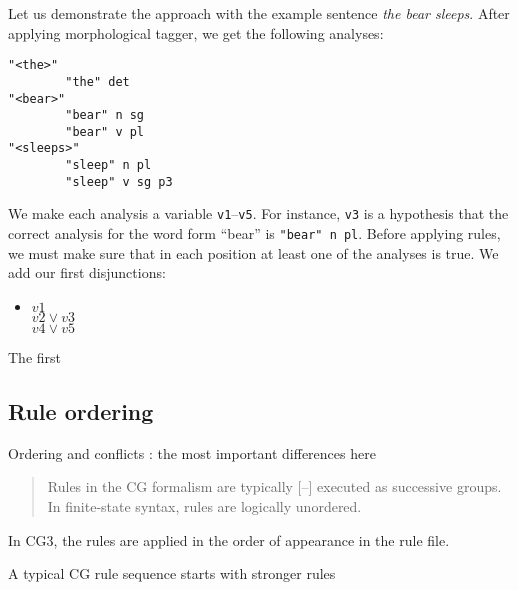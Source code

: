 \documentclass[11pt]{article}
\begin{document}
Let us demonstrate the approach with the example sentence 
\emph{the bear sleeps}. After applying morphological tagger, we get the following analyses:

\begin{verbatim}
"<the>"
        "the" det
"<bear>"
        "bear" n sg
        "bear" v pl
"<sleeps>"
        "sleep" n pl
        "sleep" v sg p3
\end{verbatim}

We make each analysis a variable \texttt{v1}--\texttt{v5}. 
For instance, \texttt{v3} is a hypothesis that the correct analysis 
for the word form ``bear'' is \texttt{"bear" n pl}.
Before applying rules, we must make sure that in each position
at least one of the analyses is true. We add our first disjunctions:

\begin{itemize}
\item [] $v1$ \\ $v2 \vee v3$ \\ $v4 \vee v5$
\end{itemize}

The first 

\subsection{Rule ordering}
\label{ssec:ordering}

Ordering and conflicts : the most important differences here

\cite{koskenniemi92}
\begin{quote}Rules in the CG formalism are typically [--] executed as successive groups.
In finite-state syntax, rules are logically unordered.\end{quote}


In CG3, the rules are applied in the order of appearance in the rule file.

A typical CG rule sequence starts with stronger rules  






\end{document}
